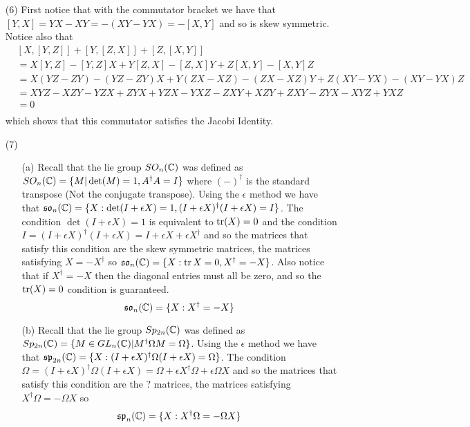 \documentclass[12pt]{amsart}
\begin{document}
\begin{itemize}
    
    \item[(6)] %
    First notice that with the commutator bracket we have that $[Y,X]=YX-XY=-(XY-YX)=-[X,Y]$ and so is skew symmetric.
    Notice also that 
    \begin{align*}
        &[X,[Y,Z]]+[Y,[Z,X]]+[Z,[X,Y]]\\
        &=X[Y,Z]-[Y,Z]X+Y[Z,X]-[Z,X]Y+Z[X,Y]-[X,Y]Z\\
        &=X(YZ-ZY)-(YZ-ZY)X+Y(ZX-XZ)-(ZX-XZ)Y+Z(XY-YX)-(XY-YX)Z\\
        &=XYZ-XZY -YZX+ZYX +YZX-YXZ -ZXY+XZY +ZXY-ZYX -XYZ+YXZ\\
        &= 0 \\
    \end{align*}
    which shows that this commutator satisfies the Jacobi Identity.


    \item[(7)] %
    \begin{itemize}
        \item[(a)] Recall that the lie group $SO_n(\mathbb{C})$ was defined as 
        $SO_n(\mathbb{C})=\{M| \det(M)=1, A^\dagger A=I\}$ where $(-)^\dagger$ 
        is the standard transpose (Not the conjugate transpose).
        Using the $\epsilon$ method we have that 
        $\mathfrak{so}_n(\mathbb{C})=\{X: \det(I+\epsilon X)=1, (I+\epsilon X)^\dagger (I+\epsilon X)=I\}$.
        The condition $\det(I+\epsilon X)=1$ is equivalent to $\operatorname{\mathrm{tr}}(X)=0$ and 
        the condition $I=(I+\epsilon X)^\dagger (I+\epsilon X)=I+\epsilon X+\epsilon X^\dagger$ and 
        so the matrices that satisfy this condition are the skew symmetric matrices, the matrices 
        satisfying $X=-X^\dagger$ so $\mathfrak{so}_n(\mathbb{C})=\{X: \operatorname{\mathrm{tr}}{X}=0, X^\dagger = -X\}$. Also notice that 
        if $X^\dagger = -X$ then the diagonal entries must all be zero, and so the $\operatorname{\mathrm{tr}}(X)=0$ condition is guaranteed.
        \[\mathfrak{so}_n(\mathbb{C})=\{X: X^\dagger = -X\}\]


        \item[(b)] Recall that the lie group $Sp_{2n}(\mathbb{C})$ was defined as $Sp_{2n}(\mathbb{C})=\{M\in GL_n(\mathbb{C})| M^\dagger\Omega M=\Omega\}$.
        Using the $\epsilon$ method we have that 
        $\mathfrak{sp}_{2n}(\mathbb{C})=\{X: (I+\epsilon X)^\dagger\Omega (I+\epsilon X)=\Omega\}$.
        The condition $\Omega = (I+\epsilon X)^\dagger\Omega (I+\epsilon X)=\Omega+\epsilon X^\dagger\Omega+\epsilon\Omega X$ 
        and so the matrices that satisfy this condition are the ? matrices, the matrices 
        satisfying $X^\dagger\Omega=-\Omega X$ so \[\mathfrak{sp}_n(\mathbb{C})=\{X: X^\dagger\Omega=-\Omega X\}\]
        


\end{itemize}
\end{itemize}
\end{document}

